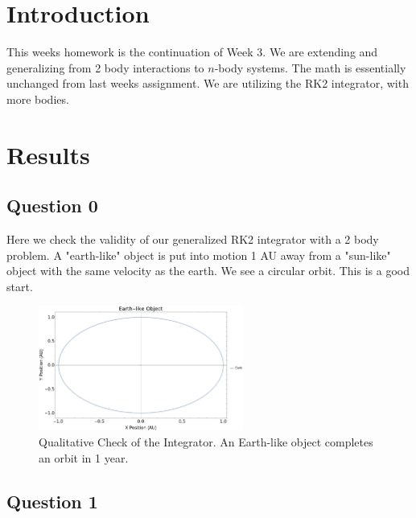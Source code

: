 \documentclass{article}
\author{\hwauthor}
\title{\hwtitle}
\date{\hwdate}
\begin{document}
\maketitle
\thispagestyle{fancy}

\section{Introduction}
 
This weeks homework is the continuation of Week 3. We are extending and generalizing from 2 body interactions to $n$-body systems. The math is essentially unchanged from last weeks assignment. We are utilizing the RK2 integrator, with more bodies.

\section{Results}

\subsection{Question 0}

Here we check the validity of our generalized RK2 integrator with a 2 body problem. A "earth-like" object is put into motion 1 AU away from a "sun-like" object with the same velocity as the earth. We see a circular orbit. This is a good start.

\begin{figure}[!htb]
	\begin{center}
		\includegraphics[width=0.6\textwidth]{images/p0.pdf}
	\end{center}
	\caption{Qualitative Check of the Integrator. An Earth-like object completes an orbit in 1 year.}
\label{fig:qual}
\end{figure}
\FloatBarrier

\subsection{Question 1}
\end{document}
